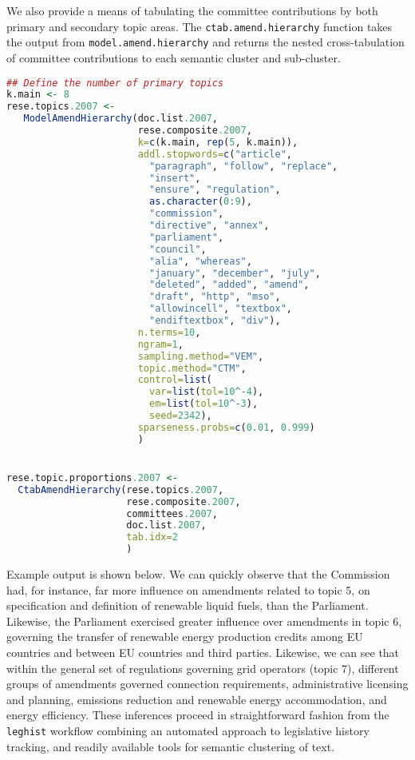\documentclass[11pt]{article}
\begin{document}
We also provide a means of tabulating the committee contributions by
both primary and secondary topic areas. The
\texttt{ctab.amend.hierarchy} function takes the output from
\texttt{model.amend.hierarchy} and returns the nested cross-tabulation
of committee contributions to each semantic cluster and sub-cluster. 

\begin{lstlisting}[language=R, numbers=none]
## Define the number of primary topics
k.main <- 8
rese.topics.2007 <- 
   ModelAmendHierarchy(doc.list.2007,
                       rese.composite.2007,
                       k=c(k.main, rep(5, k.main)),
                       addl.stopwords=c("article",
                         "paragraph", "follow", "replace",
                         "insert",
                         "ensure", "regulation",
                         as.character(0:9),
                         "commission",
                         "directive", "annex",
                         "parliament",
                         "council",
                         "alia", "whereas",
                         "january", "december", "july",
                         "deleted", "added", "amend",
                         "draft", "http", "mso",
                         "allowincell", "textbox",
                         "endiftextbox", "div"),
                       n.terms=10,
                       ngram=1,
                       sampling.method="VEM",
                       topic.method="CTM",
                       control=list(
                         var=list(tol=10^-4),
                         em=list(tol=10^-3),
                         seed=2342),
                       sparseness.probs=c(0.01, 0.999)
                       )


rese.topic.proportions.2007 <-
  CtabAmendHierarchy(rese.topics.2007,
                     rese.composite.2007,
                     committees.2007,
                     doc.list.2007,
                     tab.idx=2
                     )

\end{lstlisting}

Example output is shown below. We can quickly observe that the
Commission had, for instance, far more influence on amendments related
to topic 5, on specification and definition of renewable liquid fuels,
than the Parliament. Likewise, the Parliament exercised greater
influence over amendments in topic 6, governing the transfer of
renewable energy production credits among EU countries and between EU
countries and third parties. Likewise, we can see that within the
general set of regulations governing grid operators (topic 7),
different groups of amendments governed connection requirements,
administrative licensing and planning, emissions reduction and
renewable energy accommodation, and energy efficiency. These
inferences proceed in straightforward fashion from the
\texttt{leghist} workflow combining
an automated approach to legislative history tracking, and readily
available tools for semantic clustering of text. 
\end{document}

